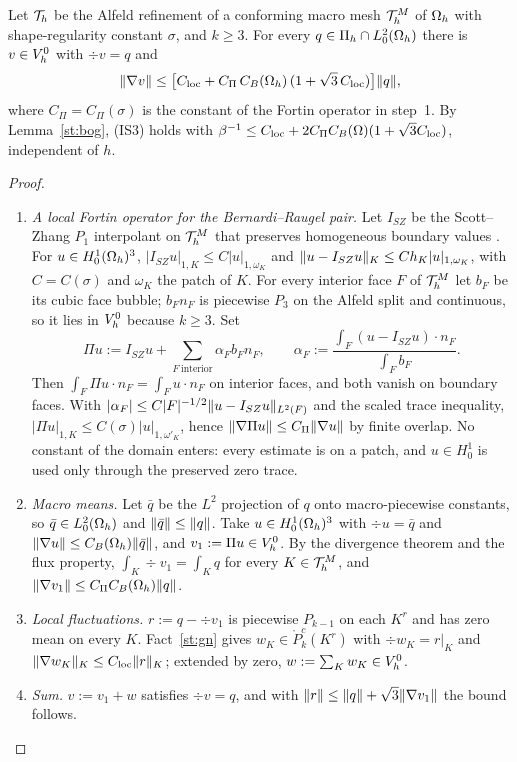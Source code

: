 \begin{lemma}\label{st:IS3}
Let $\mathcal T_h$ be the Alfeld refinement of a conforming macro mesh $\mathcal T_h^M$ of $\Omega_h$ with shape-regularity constant $\sigma$, and $k\ge3$. For every $q\in\Pi_h\cap L^2_0(\Omega_h)$ there is $v\in V_h^0$ with $\div v=q$ and
\[
\lVert \nabla v\rVert\le\bigl[C_{\rm loc}+C_\Pi\,C_B(\Omega_h)\,(1+\sqrt3\,C_{\rm loc})\bigr]\lVert q\rVert,
\]
where $C_\Pi=C_\Pi(\sigma)$ is the constant of the Fortin operator in step~1. By Lemma~\ref{st:bog}, (IS3) holds with $\beta^{-1}\le C_{\rm loc}+2C_\Pi C_B(\Omega)(1+\sqrt3C_{\rm loc})$, independent of $h$.
\end{lemma}

\begin{proof}
\begin{enumerate}
\item \emph{A local Fortin operator for the Bernardi--Raugel pair.} Let $I_{SZ}$ be the Scott--Zhang $P_1$ interpolant on $\mathcal T_h^M$ that preserves homogeneous boundary values \cite{ScottZhang1990}. For $u\in H^1_0(\Omega_h)^3$, $|I_{SZ}u|_{1,K}\le C|u|_{1,\omega_K}$ and $\lVert u-I_{SZ}u\rVert_K\le Ch_K|u|_{1,\omega_K}$, with $C=C(\sigma)$ and $\omega_K$ the patch of $K$. For every interior face $F$ of $\mathcal T_h^M$ let $b_F$ be its cubic face bubble; $b_Fn_F$ is piecewise $P_3$ on the Alfeld split and continuous, so it lies in $V_h^0$ because $k\ge3$. Set
\[
\Pi u:=I_{SZ}u+\sum_{F\ \text{interior}}\alpha_Fb_Fn_F,\qquad\alpha_F:=\frac{\int_F(u-I_{SZ}u)\cdot n_F}{\int_Fb_F}.
\]
Then $\int_F\Pi u\cdot n_F=\int_Fu\cdot n_F$ on interior faces, and both vanish on boundary faces. With $|\alpha_F|\le C|F|^{-1/2}\lVert u-I_{SZ}u\rVert_{L^2(F)}$ and the scaled trace inequality, $|\Pi u|_{1,K}\le C(\sigma)|u|_{1,\omega'_K}$, hence $\lVert \nabla\Pi u\rVert\le C_\Pi\lVert \nabla u\rVert$ by finite overlap. No constant of the domain enters: every estimate is on a patch, and $u\in H^1_0$ is used only through the preserved zero trace.
\item \emph{Macro means.} Let $\bar q$ be the $L^2$ projection of $q$ onto macro-piecewise constants, so $\bar q\in L^2_0(\Omega_h)$ and $\lVert \bar q\rVert\le\lVert q\rVert$. Take $u\in H^1_0(\Omega_h)^3$ with $\div u=\bar q$ and $\lVert \nabla u\rVert\le C_B(\Omega_h)\lVert \bar q\rVert$, and $v_1:=\Pi u\in V_h^0$. By the divergence theorem and the flux property, $\int_K\div v_1=\int_Kq$ for every $K\in\mathcal T_h^M$, and $\lVert \nabla v_1\rVert\le C_\Pi C_B(\Omega_h)\lVert q\rVert$.
\item \emph{Local fluctuations.} $r:=q-\div v_1$ is piecewise $P_{k-1}$ on each $K^r$ and has zero mean on every $K$. Fact~\ref{st:gn} gives $w_K\in\mathring P^c_k(K^r)$ with $\div w_K=r|_K$ and $\lVert \nabla w_K\rVert_K\le C_{\rm loc}\lVert r\rVert_K$; extended by zero, $w:=\sum_Kw_K\in V_h^0$.
\item \emph{Sum.} $v:=v_1+w$ satisfies $\div v=q$, and with $\lVert r\rVert\le\lVert q\rVert+\sqrt3\lVert \nabla v_1\rVert$ the bound follows.\qedhere
\end{enumerate}
\end{proof}

